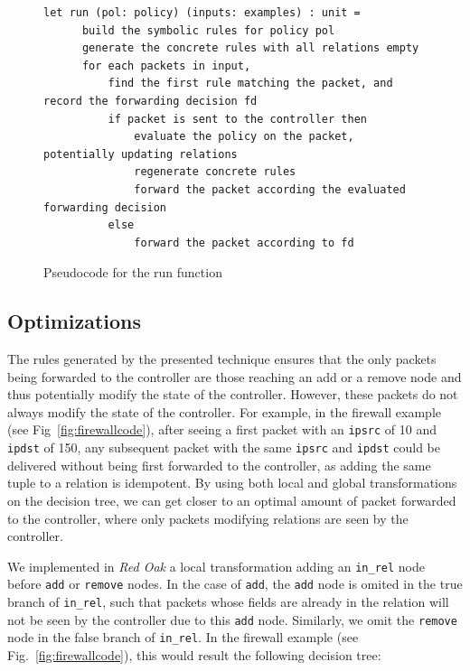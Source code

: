 \documentclass[preprint]{sigplanconf}
\begin{document}
\begin{figure}[ht]
\begin{lstlisting}
let run (pol: policy) (inputs: examples) : unit =
      build the symbolic rules for policy pol
      generate the concrete rules with all relations empty
      for each packets in input,
          find the first rule matching the packet, and record the forwarding decision fd
          if packet is sent to the controller then
              evaluate the policy on the packet, potentially updating relations
              regenerate concrete rules
              forward the packet according the evaluated forwarding decision
          else
              forward the packet according to fd 
\end{lstlisting}

\caption{Pseudocode for the run function}
\label{fig:run-pseudo}
  \end{figure}



\subsection*{Optimizations}
The rules generated by the presented technique ensures that the only packets being forwarded to the controller are those reaching an add or a remove node and thus potentially modify the state of the controller. However, these packets do not always modify the state of the controller. For example, in the firewall example (see Fig~\ref{fig:firewallcode}), after seeing a first packet with an \lstinline|ipsrc| of 10 and \lstinline|ipdst| of 150, any subsequent packet with the same \lstinline|ipsrc| and \lstinline|ipdst| could be delivered without being first forwarded to the controller, as adding the same tuple to a relation is idempotent. By using both local and global transformations on the decision tree, we can get closer to an optimal amount of packet forwarded to the controller, where only packets modifying relations are seen by the controller.

We implemented in \textit{Red Oak} a local transformation adding an \lstinline|in_rel| node before \lstinline|add| or \lstinline|remove| nodes. In the case of \lstinline|add|, the \lstinline|add| node is omited in the true branch of \lstinline|in_rel|, such that packets whose fields are already in the relation will not be seen by the controller due to this \lstinline|add| node. Similarly, we omit the \lstinline|remove| node in the false branch of \lstinline|in_rel|. In the firewall example (see Fig.~\ref{fig:firewallcode}), this would result the following decision tree:
\end{document}
